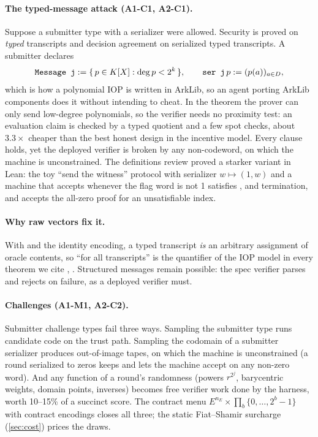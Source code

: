 \paragraph{The typed-message attack (A1-C1, A2-C1).} Suppose a submitter type  with
a serializer  were allowed. Security is proved on
\emph{typed} transcripts and decision agreement on serialized typed transcripts. A submitter
declares
\[ \text{\texttt{Message j}} := \{\,p\in K[X] : \deg p<2^k\,\},\qquad
   \text{\texttt{ser j}}\,p := (p(a))_{a\in D}, \]
which is how a polynomial IOP is written in ArkLib, so an agent porting ArkLib components does it
without intending to cheat. In the theorem the prover can only send low-degree polynomials, so the
verifier needs no proximity test: an evaluation claim is checked by a typed quotient and a few
spot checks, about $3.3\times$ cheaper than the best honest design in the incentive model. Every
clause holds, yet the deployed verifier is broken by any non-codeword, on which the machine is
unconstrained. The definitions review proved a starker variant in Lean: the toy ``send the
witness'' protocol with serializer $w\mapsto(1,w)$ and a machine that accepts whenever the flag word
is not 1 satisfies ,  and termination, and accepts the all-zero proof for
an unsatisfiable index.

\paragraph{Why raw vectors fix it.} With  and the identity encoding, a typed
transcript \emph{is} an arbitrary assignment of oracle contents, so ``for all transcripts'' is the
quantifier of the IOP model in every theorem we cite \cite[Def.~23.2.1]{CY24-Book},
\cite[Def.~B.1]{BCFW25-WARP}. Structured messages remain possible: the spec verifier parses and
rejects on failure, as a deployed verifier must.

\paragraph{Challenges (A1-M1, A2-C2).} Submitter challenge types fail three ways. Sampling the
submitter type runs candidate code on the trust path. Sampling the codomain of a submitter
serializer produces out-of-image tapes, on which the machine is unconstrained (a  round
serialized to zeros keeps  and lets the machine accept on any non-zero word). And any
function of a round's randomness (powers $r^{2^j}$, barycentric weights, domain points, inverses)
becomes free verifier work done by the harness, worth 10--15\% of a succinct score. The contract
menu $E^{n_E}\times\prod_b\{0,\dots,2^b-1\}$ with contract encodings closes all three; the static
Fiat--Shamir surcharge (\cref{sec:cost}) prices the draws.

